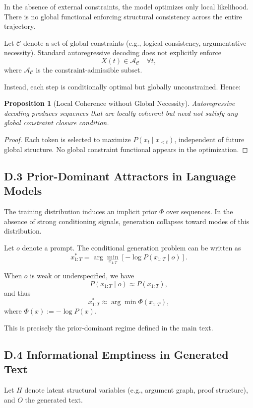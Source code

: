 \documentclass[12pt, oneside]{article}
\theoremstyle{plain}
\newtheorem{proposition}[theorem]{Proposition}
\theoremstyle{definition}
\theoremstyle{remark}
\begin{document}
In the absence of external constraints, the model optimizes only local likelihood. There is no global functional enforcing structural consistency across the entire trajectory.

Let $\mathcal{C}$ denote a set of global constraints (e.g., logical consistency, argumentative necessity). Standard autoregressive decoding does not explicitly enforce
\[
X(t) \in \mathcal{A}_{\mathcal{C}} \quad \forall t,
\]
where $\mathcal{A}_{\mathcal{C}}$ is the constraint-admissible subset.

Instead, each step is conditionally optimal but globally unconstrained. Hence:

\begin{proposition}[Local Coherence without Global Necessity]
Autoregressive decoding produces sequences that are locally coherent but need not satisfy any global constraint closure condition.
\end{proposition}

\begin{proof}
Each token is selected to maximize $P(x_t \mid x_{<t})$, independent of future global structure. No global constraint functional appears in the optimization.
\end{proof}

\subsection{D.3 Prior-Dominant Attractors in Language Models}

The training distribution induces an implicit prior $\Phi$ over sequences. In the absence of strong conditioning signals, generation collapses toward modes of this distribution.

Let $o$ denote a prompt. The conditional generation problem can be written as
\[
x_{1:T}^* = \arg\min_{x_{1:T}} \left[ -\log P(x_{1:T} \mid o) \right].
\]

When $o$ is weak or underspecified, we have
\[
P(x_{1:T} \mid o) \approx P(x_{1:T}),
\]
and thus
\[
x_{1:T}^* \approx \arg\min \Phi(x_{1:T}),
\]
where $\Phi(x) := -\log P(x)$.

This is precisely the prior-dominant regime defined in the main text.

\subsection{D.4 Informational Emptiness in Generated Text}

Let $H$ denote latent structural variables (e.g., argument graph, proof structure), and $O$ the generated text.
\end{document}
